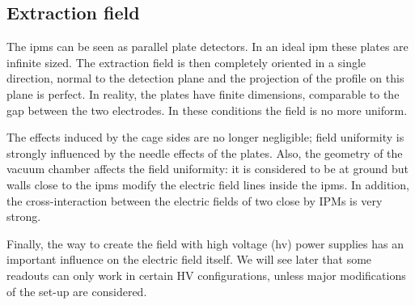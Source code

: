 \begin{refsection}
  \section{Extraction field}
  
  The \acrshort{ipm}s can be seen as parallel plate detectors. In an ideal \acrshort{ipm} these plates are infinite sized. The extraction field is then completely oriented in a single direction, normal to the detection plane and the projection of the profile on this plane is perfect. In reality, the plates have finite dimensions, comparable to the gap between the two electrodes. In these conditions the field is no more uniform.

  The effects induced by the cage sides are no longer negligible; field uniformity is strongly influenced by the needle effects of the plates.
  Also, the geometry of the vacuum chamber affects the field uniformity: it is considered to be at ground but walls close to the \acrshort{ipm}s modify the electric field lines inside the \acrshort{ipm}s. In addition, the cross-interaction between the electric fields of two close by IPMs is very strong.

  Finally, the way to create the field with high voltage (\acrshort{hv}) power supplies has an important influence on the electric field itself. We will see later that some readouts can only work in certain HV configurations, unless major modifications of the set-up are considered.


\end{refsection}
